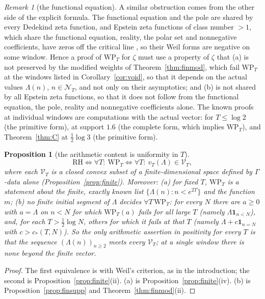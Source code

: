\documentclass[11pt]{amsart}
\newtheorem{proposition}[theorem]{Proposition}
\theoremstyle{definition}
\theoremstyle{remark}
\newtheorem{remark}[theorem]{Remark}
\newcommand{\NT}{\mathcal N_T}
\begin{document}
\begin{remark}[the functional equation]\label{rem:twohalves}
A similar obstruction comes from the other side of the explicit formula. The functional equation and
the pole are shared by every Dedekind zeta function, and Epstein zeta functions of class number $>1$,
which share the functional equation, reality, the polar set and nonnegative coefficients, have zeros off
the critical line \cite{DavenportHeilbronn1936}, so their Weil forms are negative on some window. Hence a
proof of $\mathrm{WP}_T$ for $\zeta$ must use a property of $\zeta$ that (a) is not preserved by the modified
weights of Theorem~\ref{thm:finmod}, which fail $\mathrm{WP}_T$ at the windows listed in
Corollary~\ref{cor:void}, so that it depends on the actual values $\Lambda(n)$, $n\in\NT$, and not only on
their asymptotics; and (b) is not shared by all Epstein zeta functions, so that it does not follow from
the functional equation, the pole, reality and nonnegative coefficients alone. The known proofs at
individual windows are computations with the actual vector: \cite{Paper42} for $T\le\log2$ (the
primitive form), \cite{Zhu2026} at support $1.6$ (the complete form, which implies $\mathrm{WP}_T$), and
Theorem~\ref{thm:C} at $\frac12\log3$ (the primitive form).
\end{remark}

\begin{proposition}[the arithmetic content is uniformity in $T$]\label{prop:uniform}
\[
\mathrm{RH}\iff\forall T:\ \mathrm{WP}_T\iff\forall T:\ v_T(\Lambda)\in\mathcal V_T ,
\]
where each $\mathcal V_T$ is a closed convex subset of a finite-dimensional space defined by $\Gamma$-data
alone (Proposition~\ref{prop:finite}). Moreover: \emph{(a)} for fixed $T$, $\mathrm{WP}_T$ is a statement
about the finite, exactly known list $\{\Lambda(n):n<e^{2T}\}$ and the function $m$; \emph{(b)} no finite
initial segment of $\Lambda$ decides $\forall T\,\mathrm{WP}_T$: for every $N$ there are $a\ge0$ with $a=\Lambda$
on $n<N$ for which $\mathrm{WP}_T(a)$ fails for all large $T$ (namely $\Lambda\mathbf 1_{n<N}$), and, for each
$T>\frac12\log N$, others for which it fails at that $T$ (namely $\Lambda+c\mathbf 1_{n=N}$ with $c>c_*(T,N)$). So
the only arithmetic assertion in positivity for every $T$ is that the sequence $(\Lambda(n))_{n\ge2}$ meets
every $\mathcal V_T$; at a single window there is none beyond the finite vector.
\end{proposition}
\begin{proof}
The first equivalence is \cite[Thm.~11.3]{Paper45} with Weil's criterion, as in the introduction; the
second is Proposition~\ref{prop:finite}(ii). (a) is Proposition~\ref{prop:finite}(iv). (b) is
Proposition~\ref{prop:finsupp} and Theorem~\ref{thm:finmod}(ii).
\end{proof}
\end{document}
